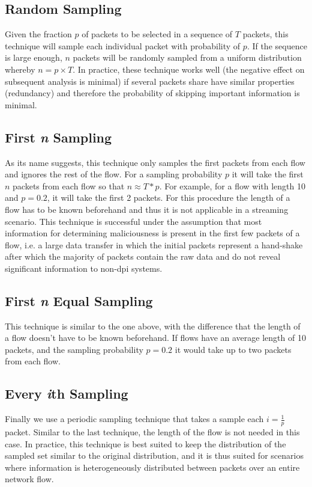 \documentclass[conference]{IEEEtran}
\begin{document}
\subsection{Random Sampling}

Given the fraction $p$ of packets to be selected in a sequence of $T$ packets, this technique will sample each individual packet with probability of $p$. If the sequence is large enough, $n$ packets will be randomly sampled from a uniform distribution whereby $n= p \times T$. In practice, these technique works well (the negative effect on subsequent analysis is minimal) if several packets share have similar properties (redundancy) and therefore the probability of skipping important information is minimal.

\subsection{First \emph{n} Sampling}
As its name suggests, this technique only samples the first packets from each flow and ignores the rest of the flow. For a sampling probability $p$ it will take the first $n$ packets from each flow so that $n \approx T * p$. For example, for a flow with length 10 and $p=0.2$, it will take the first 2 packets. For this procedure the length of a flow has to be known beforehand and thus it is not applicable in a streaming scenario. This technique is successful under the assumption that most information for determining maliciousness is present in the first few packets of a flow, i.e. a large data transfer in which the initial packets represent a hand-shake after which the majority of packets contain the raw data and do not reveal significant information to non-\gls{dpi} systems.

\subsection{First \emph{n} Equal Sampling}
This technique is similar to the one above, with the difference that the length of a flow doesn't have to be known beforehand. If flows have an average length of 10 packets, and the sampling probability $p=0.2$ it would take up to two packets from each flow.

\subsection{Every \emph{i}th Sampling}
Finally we use a periodic sampling technique that takes a sample each $i= \frac{1}{p}$ packet. Similar to the last technique, the length of the flow is not needed in this case. In practice, this technique is best suited to keep the distribution of the sampled set similar to the original distribution, and it is thus suited for scenarios where information is heterogeneously distributed between packets over an entire network flow.
\end{document}
